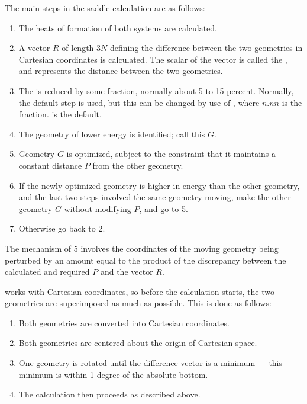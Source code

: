The main steps in the saddle calculation are as follows:
\begin{enumerate}
\item The heats of formation of both systems are calculated.

\item A vector $R$ of length $3N$ defining the difference  between  the two
geometries in Cartesian coordinates is calculated.  The scalar of the vector is
called the , and represents the distance between the two geometries.

\item  The   is  reduced  by  some fraction, normally about 5 to 15
percent. Normally, the default step is used, but this can be changed by use of
, where $n.nn$ is the fraction.   is the
default.

\item  The geometry of lower energy is identified; call this $G$.

\item Geometry $G$ is optimized, subject to  the  constraint  that  it 
maintains  a constant distance $P$ from the other geometry.

\item If the newly-optimized geometry is higher in  energy  than  the other 
geometry,  and the last two steps involved the same geometry  moving,  make 
the  other geometry $G$ without modifying $P$, and go to 5.

\item Otherwise go back to 2.
\end{enumerate}

The mechanism of 5 involves the coordinates of the moving  geometry being 
perturbed  by  an  amount equal to the product of the discrepancy between the
calculated and required $P$ and the vector $R$.

 works with Cartesian coordinates, so before the calculation
starts, the two geometries are superimposed as much as possible.  This is done
as follows:
\begin{enumerate}
\item Both geometries are converted into Cartesian coordinates.

\item Both geometries are centered about the origin of Cartesian space.

\item One geometry is  rotated  until  the  difference  vector  is  a minimum 
---  this  minimum  is  within  1 degree of the absolute bottom.

\item The  calculation then proceeds as described above.
\end{enumerate}

